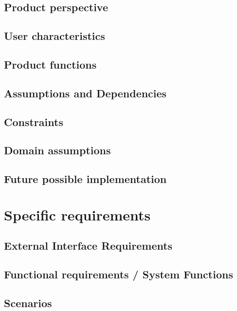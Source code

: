\documentclass[12pt, a4paper]{article}
\begin{document}
	\subsection{Product perspective}

	
	\subsection{User characteristics}

	
	\subsection{Product functions}

	
	\subsection{Assumptions and Dependencies}

	
	\subsection{Constraints}
	
	\subsection{Domain assumptions}

	
	\subsection{Future possible implementation}


\newpage
\section{Specific requirements}
	\subsection{External Interface Requirements}
	
	\subsection{Functional requirements / System Functions}
	
	\subsection{Scenarios}
	
\end{document}
